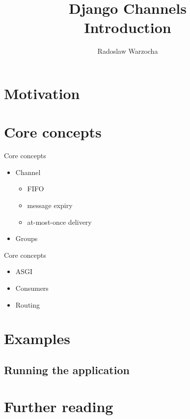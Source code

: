 \documentclass{beamer}
\title{Django Channels\\Introduction}
\author[rwar]{Radoslaw Warzocha}
\begin{document}
\begin{frame}
	\titlepage
\end{frame}

\section{Motivation}

\section{Core concepts}

\begin{frame}{Core concepts}
	\begin{itemize}
		\item Channel
			\begin{itemize}
				\item FIFO
				\item message expiry
				\item at-most-once delivery
			\end{itemize}
		\item Groups
	\end{itemize}
\end{frame}

\begin{frame}{Core concepts}
	\begin{itemize}
		\item ASGI
		\item Consumers
		\item Routing
	\end{itemize}
\end{frame}

\section{Examples}

\subsection{Running the application}

\section{Further reading}
\end{document}
